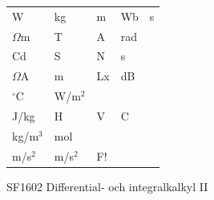 \documentclass[a6paper,10pt]{article}
\begin{document}
\noindent
{}
\vspace{-0.5\baselineskip} %
\small
\begin{center}
\end{center}
\vspace{-10pt}
\begin{table}[!h]
\begin{lyrics}
\begin{tabularx}{0.85\textwidth}{X X X X X}
W&kg&m&Wb&s
\vspace{3pt} \\
$\Omega$m&T&A&rad
\vspace{3pt} \\
Cd&S&N&s
\vspace{3pt} \\
$\Omega$A&m&Lx&dB
\vspace{3pt} \\
$^{\circ}$C&W/m$^2$ &
\vspace{5pt} \\
J/kg&H&V&C
\vspace{3pt} \\
kg/m$^3$ & mol
\vspace{3pt} \\
m/s$^2$&m/s$^2$&F!
\end{tabularx}
\end{lyrics}
\end{table}
\begin{center}
\footnotesize{SF1602 Differential- och integralkalkyl II}\\
\end{center}
\end{document}
